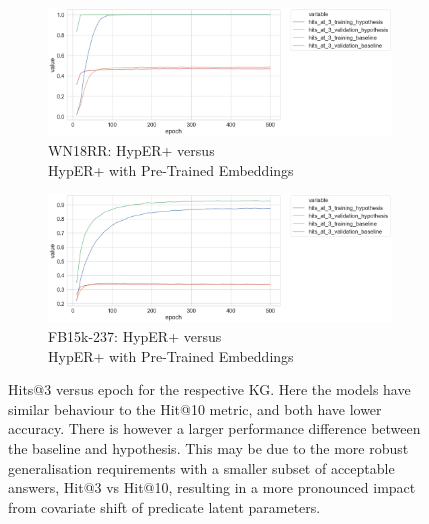 \begin{figure}[H]
	\begin{subfigure}[b]{.5\linewidth}
   		\centering
    		\includegraphics[width=1.0\linewidth, height=0.6\linewidth]{WN18RR_hits_at_3_Results_ptwv}
		\captionsetup{justification=centering}
		\caption{WN18RR: HypER+ versus \\ HypER+ with Pre-Trained Embeddings}
	\end{subfigure}
	\begin{subfigure}[b]{.5\linewidth}
   		\centering
		\includegraphics[width=1.0\linewidth, height=0.6\linewidth]{FB15k-237_hits_at_3_Results_ptwv}
		\captionsetup{justification=centering}
		\caption{FB15k-237: HypER+ versus \\ HypER+ with Pre-Trained Embeddings}
	\end{subfigure}
	\captionsetup{justification=centering}
	\caption{Hits@3 versus epoch for the respective KG. Here the models have similar behaviour to the Hit@10 metric, and both have lower accuracy. There is however a larger performance difference between the baseline and hypothesis. This may be due to the more robust generalisation requirements with a smaller subset of acceptable answers, Hit@3 vs Hit@10, resulting in a more pronounced impact from covariate shift of predicate latent parameters.}
\end{figure}


